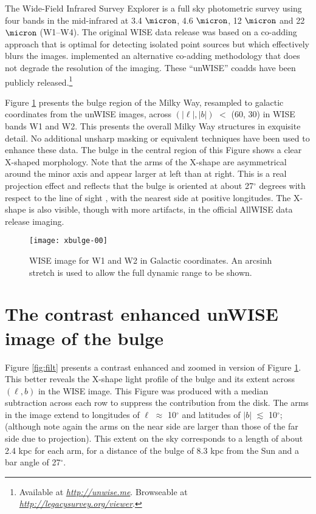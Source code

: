 \documentclass[12pt, preprint]{aastex}
\newcommand{\niceurl}[1]{\href{#1}{\textsl{#1}}}
\newcommand{\viewerurl}{\niceurl{http://legacysurvey.org/viewer}}
\begin{document}
The Wide-Field Infrared Survey Explorer \citep[WISE;][]{W2010} is a full sky photometric survey using four bands in the mid-infrared at 3.4 $\micron$, 4.6 $\micron$, 12 $\micron$ and 22 $\micron$ (W1--W4). The original WISE data release was based on a co-adding approach that is optimal for detecting isolated point sources but which effectively blurs the images. \citet{Lang2014a} implemented an alternative co-adding methodology that does not degrade the resolution of the imaging.  These ``unWISE'' coadds have been publicly released.\footnote{Available at \niceurl{http://unwise.me}. Browseable at \viewerurl.}

Figure \ref{fig:xbulge} presents the bulge region of the Milky Way,  resampled to galactic coordinates from the unWISE images, across $(|\ell|,|b|)$ $<$ (60, 30) in WISE bands W1 and W2.  This presents the overall Milky Way structures in exquisite detail.
No additional unsharp masking or equivalent techniques have been used to enhance these data. The bulge in the central region of this Figure shows a clear X-shaped morphology. Note that the arms of the X-shape are asymmetrical around the minor axis and appear larger at left than at right. This is a real projection effect and reflects that the bulge is oriented at about 27$^\circ$ degrees with respect to the line of sight \citep{Wegg2013}, with the nearest side at positive longitudes. The X-shape is also visible, though with more artifacts, in the official AllWISE data release imaging.


\begin{figure}[h!]
\centering
        \texttt{[image: xbulge-00]}
\caption{WISE image for W1 and W2 in Galactic coordinates.  An arcsinh
  stretch is used to allow the full dynamic range to be shown.}
\label{fig:xbulge}
\end{figure}

\section{The contrast enhanced unWISE image of the bulge}

Figure \ref{fig:filt} presents a contrast enhanced and zoomed in version of Figure \ref{fig:xbulge}. This better reveals the X-shape light profile of the bulge and its extent across $(\ell,b)$ in the WISE image. This Figure was produced with a median subtraction across each row to suppress the contribution from the disk. The arms in the image extend to longitudes of $\ell$ $\approx$ 10$^\circ$ and latitudes of $|b|$ $\lesssim$ 10$^\circ$; (although note again the arms on the near side are larger than those of the far side due to projection). This extent on the sky corresponds to a length of about 2.4 kpc for each arm, for a distance of the bulge of 8.3 kpc from the Sun and a bar angle of 27$^\circ$.
\end{document}
